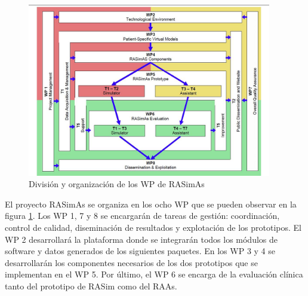 
\begin{figure}
    \centering
    \includegraphics[width=0.95\textwidth]{IMG/wp_overview.jpg}
    \caption{División y organización de los \acl{WP} de \ac{RASimAs}}
    \label{fig:wp_rasimas}
\end{figure}

El proyecto \ac{RASimAs} se organiza en los ocho \ac{WP} que se pueden observar en la figura \ref{fig:wp_rasimas}. Los \ac{WP} 1, 7 y 8 se encargarán de tareas de gestión: coordinación, control de calidad, diseminación de resultados y explotación de los prototipos. El \ac{WP} 2 desarrollará la plataforma donde se integrarán todos los módulos de software y datos generados de los siguientes paquetes. En los \ac{WP} 3 y 4 se desarrollarán los componentes necesarios de los dos prototipos que se implementan en el \ac{WP} 5. Por último, el \ac{WP} 6 se encarga de la evaluación clínica tanto del prototipo de \ac{RASim} como del \ac{RAAs}. 



